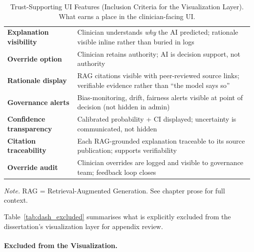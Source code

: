 {\tablestripes\tablefontsize
{}
\begin{xltabular}{\textwidth}{@{} >{\raggedright\arraybackslash}p{3.0cm} L @{}}
\caption[Trust-Supporting UI Features]{Trust-Supporting UI Features (Inclusion Criteria for the Visualization Layer). What earns a place in the clinician-facing UI.}\label{tab:dash_trust_features} \\
\toprule
{} &  \\
\midrule
\endfirsthead
\endhead
\bottomrule
\endlastfoot
\textbf{Explanation visibility}    & Clinician understands \emph{why} the AI predicted; rationale visible inline rather than buried in logs \\
\textbf{Override option}           & Clinician retains authority; AI is decision support, not authority \\
\textbf{Rationale display}         & RAG citations visible with peer-reviewed source links; verifiable evidence rather than ``the model says so'' \\
\textbf{Governance alerts}         & Bias-monitoring, drift, fairness alerts visible at point of decision (not hidden in admin) \\
\textbf{Confidence transparency}   & Calibrated probability + CI displayed; uncertainty is communicated, not hidden \\
\textbf{Citation traceability}     & Each RAG-grounded explanation traceable to its source publication; supports verifiability \\
\textbf{Override audit}            & Clinician overrides are logged and visible to governance team; feedback loop closes \\
\end{xltabular}}
\vspace{0.3em}\noindent\textit{Note.} RAG = Retrieval-Augmented Generation. See chapter prose for full context.

\noindent Table~\ref{tab:dash_excluded} summarises what is explicitly excluded from the dissertation's visualization layer for appendix review.

\paragraph{Excluded from the Visualization.}




